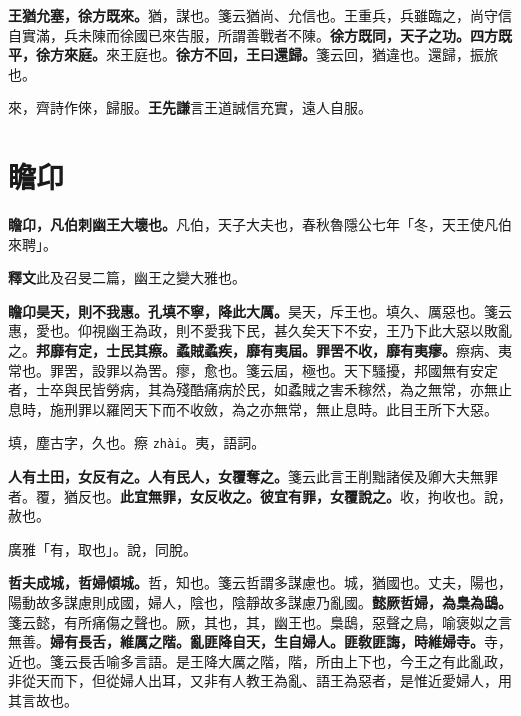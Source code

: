 \textbf{王猶允塞，徐方既來。}{\footnotesize 猶，謀也。箋云猶尚、允信也。王重兵，兵雖臨之，尚守信自實滿，兵未陳而徐國已來告服，所謂善戰者不陳。}\textbf{徐方既同，天子之功。四方既平，徐方來庭。}{\footnotesize 來王庭也。}\textbf{徐方不回，王曰還歸。}{\footnotesize 箋云回，猶違也。還歸，振旅也。}

\begin{quoting}來，齊詩作倈，歸服。\textbf{王先謙}言王道誠信充實，遠人自服。\end{quoting}

\section{瞻卬}


\textbf{瞻卬，凡伯刺幽王大壞也。}{\footnotesize 凡伯，天子大夫也，春秋魯隱公七年「冬，天王使凡伯來聘」。}

\begin{quoting}\textbf{釋文}此及召旻二篇，幽王之變大雅也。\end{quoting}

\textbf{瞻卬昊天，則不我惠。孔填不寧，降此大厲。}{\footnotesize 昊天，斥王也。填久、厲惡也。箋云惠，愛也。仰視幽王為政，則不愛我下民，甚久矣天下不安，王乃下此大惡以敗亂之。}\textbf{邦靡有定，士民其瘵。蟊賊蟊疾，靡有夷屆。罪罟不收，靡有夷瘳。}{\footnotesize 瘵病、夷常也。罪罟，設罪以為罟。瘳，愈也。箋云屆，極也。天下騷擾，邦國無有安定者，士卒與民皆勞病，其為殘酷痛病於民，如蟊賊之害禾稼然，為之無常，亦無止息時，施刑罪以羅罔天下而不收斂，為之亦無常，無止息時。此目王所下大惡。}

\begin{quoting}填，塵古字，久也。瘵 \texttt{zhài}。夷，語詞。\end{quoting}

\textbf{人有土田，女反有之。人有民人，女覆奪之。}{\footnotesize 箋云此言王削黜諸侯及卿大夫無罪者。覆，猶反也。}\textbf{此宜無罪，女反收之。彼宜有罪，女覆說之。}{\footnotesize 收，拘收也。說，赦也。}

\begin{quoting}廣雅「有，取也」。說，同脫。\end{quoting}

\textbf{哲夫成城，哲婦傾城。}{\footnotesize 哲，知也。箋云哲謂多謀慮也。城，猶國也。丈夫，陽也，陽動故多謀慮則成國，婦人，陰也，陰靜故多謀慮乃亂國。}\textbf{懿厥哲婦，為梟為鴟。}{\footnotesize 箋云懿，有所痛傷之聲也。厥，其也，其，幽王也。梟鴟，惡聲之鳥，喻褒姒之言無善。}\textbf{婦有長舌，維厲之階。亂匪降自天，生自婦人。匪敎匪誨，時維婦寺。}{\footnotesize 寺，近也。箋云長舌喻多言語。是王降大厲之階，階，所由上下也，今王之有此亂政，非從天而下，但從婦人出耳，又非有人教王為亂、語王為惡者，是惟近愛婦人，用其言故也。}

